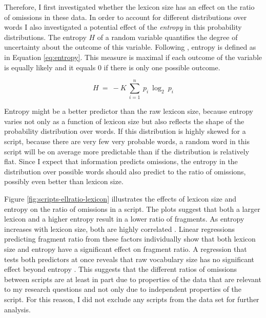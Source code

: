 Therefore, I first investigated whether the lexicon size has an effect on the ratio of omissions in these data. In order to account for different distributions over words I also investigated a potential effect of the \textit{entropy} in this probability distributions. The entropy $H$ of a random variable quantifies the degree of uncertainty about the outcome of this variable. Following \citet[393]{shannon1948}, entropy is defined as in Equation \ref{eq:entropy}. This measure is maximal if each outcome of the variable is equally likely and it equals 0 if there is only one possible outcome.

\begin{equation}
 H\ =\ - K\ \sum_{i=1}^n\ p_i\ \log_2 \ p_i \label{eq:entropy}
\end{equation}

Entropy might be a better predictor than the raw lexicon size, because entropy varies not only as a function of lexicon size but also reflects the shape of the probability distribution over words. If this distribution is highly skewed for a script, because there are very few very probable words, a random word in this script will be on average more predictable than if the distribution is relatively flat. Since I expect that information predicts omissions, the entropy in the distribution over possible words should also predict to the ratio of omissions, possibly even better than lexicon size.

Figure \ref{fig:scripts-ellratio-lexicon} illustrates the effects of lexicon size and entropy on the ratio of omissions in a script. The plots suggest that both a larger lexicon and a higher entropy result in a lower ratio of fragments. As entropy increases with lexicon size, both are highly correlated . Linear regressions predicting fragment ratio from these factors individually show that both lexicon size  and entropy  have a significant effect on fragment ratio. A regression that tests both predictors at once reveals that raw vocabulary size has no significant effect beyond entropy . This suggests that the different ratios of omissions between scripts are at least in part due to properties of the data that are relevant to my research questions and not only due to independent properties of the script. For this reason, I did not exclude any scripts from the data set for further analysis.


